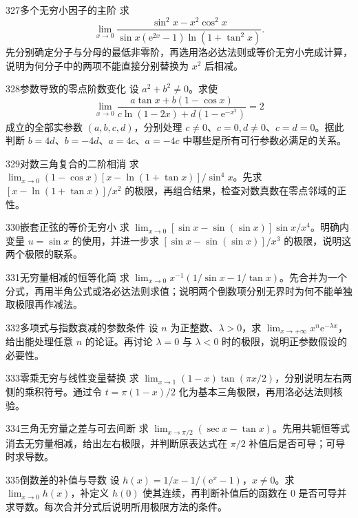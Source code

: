 \begin{exercise}{327}{多个无穷小因子的主阶}
求
\[\lim_{x\to0}\frac{\sin^2x-x^2\cos^2x}{\sin x(\mathrm e^{2x}-1)\ln(1+\tan^2x)}.\]
先分别确定分子与分母的最低非零阶，再选用洛必达法则或等价无穷小完成计算，说明为何分子中的两项不能直接分别替换为 $x^2$ 后相减。
\end{exercise}
\begin{exercise}{328}{参数导致的零点阶数变化}
设 $a^2+b^2\ne0$。求使
\[\lim_{x\to0}\frac{a\tan x+b(1-\cos x)}{c\ln(1-2x)+d(1-\mathrm e^{-x^2})}=2\]
成立的全部实参数 $(a,b,c,d)$，分别处理 $c\ne0$、$c=0,d\ne0$、$c=d=0$。据此判断 $b=4d$、$b=-4d$、$a=4c$、$a=-4c$ 中哪些是所有可行参数必满足的关系。
\end{exercise}
\begin{exercise}{329}{对数三角复合的二阶相消}
求 $\lim_{x\to0}(1-\cos x)[x-\ln(1+\tan x)]/\sin^4x$。先求 $[x-\ln(1+\tan x)]/x^2$ 的极限，再组合结果，检查对数真数在零点邻域的正性。
\end{exercise}
\begin{exercise}{330}{嵌套正弦的等价无穷小}
求 $\lim_{x\to0}[\sin x-\sin(\sin x)]\sin x/x^4$。明确内变量 $u=\sin x$ 的使用，并进一步求 $[\sin x-\sin(\sin x)]/x^3$ 的极限，说明这两个极限的联系。
\end{exercise}
\begin{exercise}{331}{无穷量相减的恒等化简}
求 $\lim_{x\to0}x^{-1}(1/\sin x-1/\tan x)$。先合并为一个分式，再用半角公式或洛必达法则求值；说明两个倒数项分别无界时为何不能单独取极限再作减法。
\end{exercise}
\begin{exercise}{332}{多项式与指数衰减的参数条件}
设 $n$ 为正整数、$\lambda>0$，求 $\lim_{x\to+\infty}x^n\mathrm e^{-\lambda x}$，给出能处理任意 $n$ 的论证。再讨论 $\lambda=0$ 与 $\lambda<0$ 时的极限，说明正参数假设的必要性。
\end{exercise}
\begin{exercise}{333}{零乘无穷与线性变量替换}
求 $\lim_{x\to1}(1-x)\tan(\pi x/2)$，分别说明左右两侧的乘积符号。通过令 $t=\pi(1-x)/2$ 化为基本三角极限，再用洛必达法则核验。
\end{exercise}
\begin{exercise}{334}{三角无穷量之差与可去间断}
求 $\lim_{x\to\pi/2}(\sec x-\tan x)$。先用共轭恒等式消去无穷量相减，给出左右极限，并判断原表达式在 $\pi/2$ 补值后是否可导；可导时求导数。
\end{exercise}
\begin{exercise}{335}{倒数差的补值与导数}
设 $h(x)=1/x-1/(\mathrm e^x-1)$，$x\ne0$。求 $\lim_{x\to0}h(x)$，补定义 $h(0)$ 使其连续，再判断补值后的函数在 $0$ 是否可导并求导数。每次合并分式后说明所用极限方法的条件。
\end{exercise}
